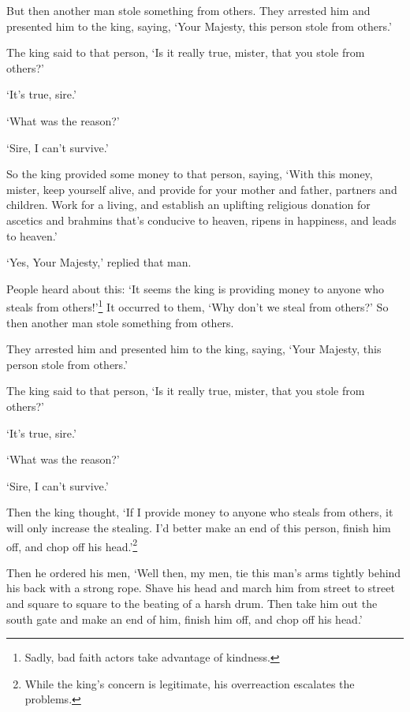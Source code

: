 \documentclass[12pt,openany]{book}%
\begin{document}
But then another man stole something from others. They arrested him and presented him to the king, saying, ‘Your Majesty, this person stole from others.’ 

The king said to that person, ‘Is it really true, mister, that you stole from others?’ 

‘It’s true, sire.’ 

‘What was the reason?’ 

‘Sire, I can’t survive.’ 

So the king provided some money to that person, saying, ‘With this money, mister, keep yourself alive, and provide for your mother and father, partners and children. Work for a living, and establish an uplifting religious donation for ascetics and brahmins that’s conducive to heaven, ripens in happiness, and leads to heaven.’ 

‘Yes, Your Majesty,’ replied that man. 

People heard about this: ‘It seems the king is providing money to anyone who steals from others!’\footnote{Sadly, bad faith actors take advantage of kindness. } It occurred to them, ‘Why don’t we steal from others?’ So then another man stole something from others. 

They arrested him and presented him to the king, saying, ‘Your Majesty, this person stole from others.’ 

The king said to that person, ‘Is it really true, mister, that you stole from others?’ 

‘It’s true, sire.’ 

‘What was the reason?’ 

‘Sire, I can’t survive.’ 

Then the king thought, ‘If I provide money to anyone who steals from others, it will only increase the stealing. I’d better make an end of this person, finish him off, and chop off his head.’\footnote{While the king’s concern is legitimate, his overreaction escalates the problems. } 

Then he ordered his men, ‘Well then, my men, tie this man’s arms tightly behind his back with a strong rope. Shave his head and march him from street to street and square to square to the beating of a harsh drum. Then take him out the south gate and make an end of him, finish him off, and chop off his head.’ 
\end{document}
